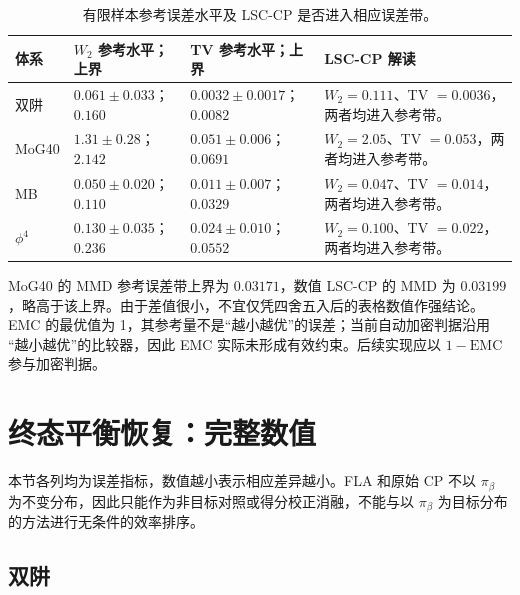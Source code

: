 \documentclass[11pt,a4paper]{article}
\begin{document}
\begin{table}[H]
\centering
\small
\begin{tabularx}{\textwidth}{L{2.3cm}C{3.0cm}C{3.0cm}Y}
\toprule
体系 & $W_2$ 参考水平；上界 & TV 参考水平；上界 & LSC-CP 解读 \\
\midrule
双阱 &
$0.061\pm0.033$；$0.160$ &
$0.0032\pm0.0017$；$0.0082$ &
$W_2=0.111$、TV $=0.0036$，两者均进入参考带。 \\
MoG40 &
$1.31\pm0.28$；$2.142$ &
$0.051\pm0.006$；$0.0691$ &
$W_2=2.05$、TV $=0.053$，两者均进入参考带。 \\
MB &
$0.050\pm0.020$；$0.110$ &
$0.011\pm0.007$；$0.0329$ &
$W_2=0.047$、TV $=0.014$，两者均进入参考带。 \\
$\phi^4$ &
$0.130\pm0.035$；$0.236$ &
$0.024\pm0.010$；$0.0552$ &
$W_2=0.100$、TV $=0.022$，两者均进入参考带。 \\
\bottomrule
\end{tabularx}
\caption{有限样本参考误差水平及 LSC-CP 是否进入相应误差带。}
\end{table}

MoG40 的 MMD 参考误差带上界为 $0.03171$，数值 LSC-CP 的 MMD 为
$0.03199$，略高于该上界。由于差值很小，不宜仅凭四舍五入后的表格数值作强结论。
EMC 的最优值为 1，其参考量不是“越小越优”的误差；当前自动加密判据沿用
“越小越优”的比较器，因此 EMC 实际未形成有效约束。后续实现应以
$1-\mathrm{EMC}$ 参与加密判据。

\section{终态平衡恢复：完整数值}

本节各列均为误差指标，数值越小表示相应差异越小。FLA 和原始 CP 不以
$\pi_\beta$ 为不变分布，因此只能作为非目标对照或得分校正消融，不能与以
$\pi_\beta$ 为目标分布的方法进行无条件的效率排序。

\subsection{双阱}
\end{document}
